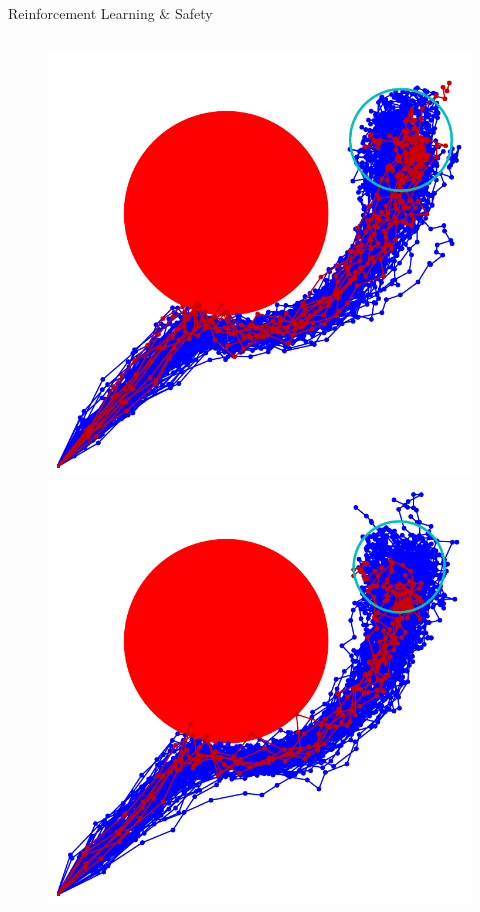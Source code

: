 \documentclass[lecture]{beamer}
\begin{document}
\begin{frame}{\normalsize Reinforcement Learning \& Safety}
\begin{columns}
\begin{overlayarea}{\textwidth}{.55\textheight}
\begin{figure}
{	}
	      \only<15>
        {
        \center
	\includegraphics[width=1\textwidth,clip]{Codes/RL/RLSafety12.pdf}
	}
	      \only<16>
        {
        \center
	\includegraphics[width=1\textwidth,clip]{Codes/RL/RLSafety13.pdf}
}
\end{figure}
\end{overlayarea}
\end{columns}
\end{frame}
\end{document}
